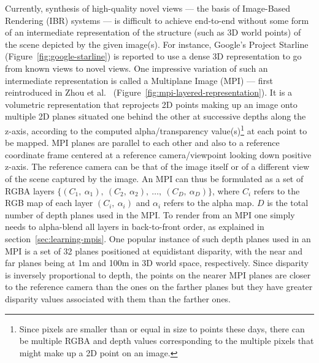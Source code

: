 Currently, synthesis of high-quality novel views --- the basis of Image-Based Rendering (IBR) systems --- is difficult to achieve end-to-end without some form of an intermediate representation of the structure (such as 3D world points) of the scene depicted by the given image(s). For instance, Google's Project Starline (Figure~\ref{fig:google-starline}) is reported to use a dense 3D representation to go from known views to novel views. One impressive variation of such an intermediate representation is called a Multiplane Image (MPI) --- first reintroduced in Zhou et al.~\cite{zhou2018stereo} (Figure~\ref{fig:mpi-layered-representation}). It is a volumetric representation that reprojects 2D points making up an image onto multiple 2D planes situated one behind the other at successive depths along the z-axis, according to the computed alpha/transparency value(s)\footnote{Since pixels are smaller than or equal in size to points these days, there can be multiple RGBA and depth values corresponding to the multiple pixels that might make up a 2D point on an image.} at each point to be mapped. MPI planes are parallel to each other and also to a reference coordinate frame centered at a reference camera/viewpoint looking down positive z-axis. The reference camera can be that of the image itself or of a different view of the scene captured by the image. An MPI can thus be formulated as a set of RGBA layers $\{(C_1,\ \alpha_1),\ (C_2,\ \alpha_2),\ \ldots,\ (C_D,\ \alpha_D)\}$, where $C_i$ refers to the RGB map of each layer $(C_i,\ \alpha_i)$ and $\alpha_i$ refers to the alpha map. $D$ is the total number of depth planes used in the MPI. To render from an MPI one simply needs to alpha-blend all layers in back-to-front order, as explained in section~\ref{sec:learning-mpis}. One popular instance of such depth planes used in an MPI is a set of 32 planes positioned at equidistant disparity, with the near and far planes being at 1m and 100m in 3D world space, respectively. Since disparity is inversely proportional to depth, the points on the nearer MPI planes are closer to the reference camera than the ones on the farther planes but they have greater disparity values associated with them than the farther ones.

